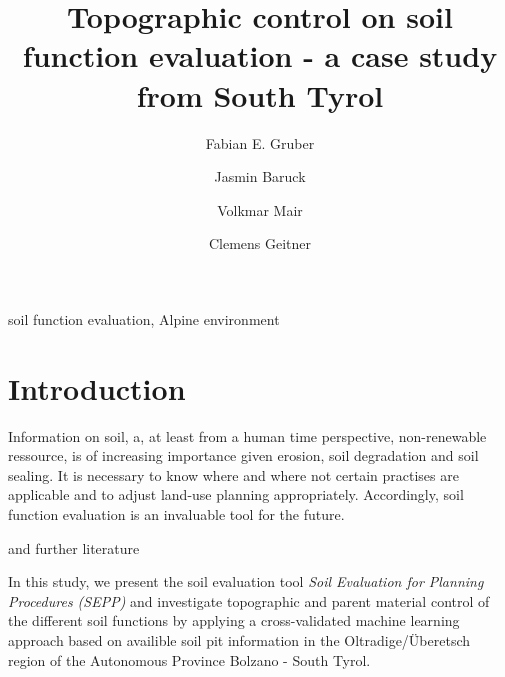 \documentclass[preprint,12pt,authoryear]{elsarticle}
\begin{document}
\begin{frontmatter}

\title{Topographic control on soil function evaluation -  a case study from South Tyrol}



\author[mymainadress]{Fabian E. Gruber}
\author[mymainadress]{Jasmin Baruck}
\author[secondadress]{Volkmar Mair}
\author[mymainadress]{Clemens Geitner}



\address[mymainadress]{Institute of Geography, University of Innsbruck, Innrain 52f, 6020 Innsbruck, Austria}
\address[secondadress]{ Amt f\"ur Geologie und Baustoffpr\"ufung, Eggentaler Stra{\ss}e 48, 39053 Kardaun, Autonomous Province Bolzano -- South Tyrol, Italy}
\begin{abstract}

\end{abstract}

\begin{keyword}
soil function evaluation, Alpine environment
\end{keyword}

\end{frontmatter}

\linenumbers

\section{Introduction}
Information on soil, a, at least from a human time perspective, non-renewable ressource, is of increasing importance given erosion, soil degradation and soil sealing. It is necessary to know where and where not certain practises are applicable and to adjust land-use planning appropriately. Accordingly, soil function evaluation is an invaluable tool for the future.\newline

\cite{Haslmayr2016} and further literature
\newline

In this study, we present the soil evaluation tool \emph{Soil Evaluation for Planning Procedures (SEPP)} and investigate topographic and parent material control of the different soil functions by applying a cross-validated machine learning approach based on availible soil pit information in the Oltradige/\"{U}beretsch region of the Autonomous Province Bolzano - South Tyrol.
\end{document}
